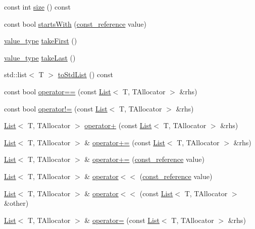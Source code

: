 \begin{DoxyCompactItemize}
const int \hyperlink{classprism_1_1_list_a6655ac493bd63dd8d7dda060b556cbcf}{size} () const 
\item 
const bool \hyperlink{classprism_1_1_list_ac0919b9f4f0312e5124cdc4eeb491114}{starts\+With} (\hyperlink{classprism_1_1_list_a31c013c3f9135c28c3c4bf489fbeb322}{const\+\_\+reference} value)
\item 
\hyperlink{classprism_1_1_list_a3e9cab77c935e6bc2e96bcb00006382e}{value\+\_\+type} \hyperlink{classprism_1_1_list_ac24aaa71bcfa3cfb80c1b466704a9b21}{take\+First} ()
\item 
\hyperlink{classprism_1_1_list_a3e9cab77c935e6bc2e96bcb00006382e}{value\+\_\+type} \hyperlink{classprism_1_1_list_a520735132b94b8cf7feaf3f0bbba2ca7}{take\+Last} ()
\item 
std\+::list$<$ T $>$ \hyperlink{classprism_1_1_list_a185229de116456a6ccb911e1b4599f8a}{to\+Std\+List} () const 
\item 
const bool \hyperlink{classprism_1_1_list_ae7ff0643ac1abebaed89ff72ff45e233}{operator==} (const \hyperlink{classprism_1_1_list}{List}$<$ T, T\+Allocator $>$ \&rhs)
\item 
const bool \hyperlink{classprism_1_1_list_a41d0ce745cf5ec6514a70a96dec8c2fb}{operator!=} (const \hyperlink{classprism_1_1_list}{List}$<$ T, T\+Allocator $>$ \&rhs)
\item 
\hyperlink{classprism_1_1_list}{List}$<$ T, T\+Allocator $>$ \hyperlink{classprism_1_1_list_aaf0b0a42de4cd250ec07943fb1255173}{operator+} (const \hyperlink{classprism_1_1_list}{List}$<$ T, T\+Allocator $>$ \&rhs)
\item 
\hyperlink{classprism_1_1_list}{List}$<$ T, T\+Allocator $>$ \& \hyperlink{classprism_1_1_list_a7e5e6a5c6f80f1b116810049ada54f95}{operator+=} (const \hyperlink{classprism_1_1_list}{List}$<$ T, T\+Allocator $>$ \&rhs)
\item 
\hyperlink{classprism_1_1_list}{List}$<$ T, T\+Allocator $>$ \& \hyperlink{classprism_1_1_list_ab0c98e10fe7476af0b6b0fc539dd8f16}{operator+=} (\hyperlink{classprism_1_1_list_a31c013c3f9135c28c3c4bf489fbeb322}{const\+\_\+reference} value)
\item 
\hyperlink{classprism_1_1_list}{List}$<$ T, T\+Allocator $>$ \& \hyperlink{classprism_1_1_list_a4420d770c7a0cb6dc31fb4c8e68fc047}{operator$<$$<$} (\hyperlink{classprism_1_1_list_a31c013c3f9135c28c3c4bf489fbeb322}{const\+\_\+reference} value)
\item 
\hyperlink{classprism_1_1_list}{List}$<$ T, T\+Allocator $>$ \& \hyperlink{classprism_1_1_list_ae7b01ded233254d4b12fd5e501c30f01}{operator$<$$<$} (const \hyperlink{classprism_1_1_list}{List}$<$ T, T\+Allocator $>$ \&other)
\item 
\hyperlink{classprism_1_1_list}{List}$<$ T, T\+Allocator $>$ \& \hyperlink{classprism_1_1_list_a8cfa274e9550ac47e36577adb7472d74}{operator=} (const \hyperlink{classprism_1_1_list}{List}$<$ T, T\+Allocator $>$ \&rhs)
\end{DoxyCompactItemize}

